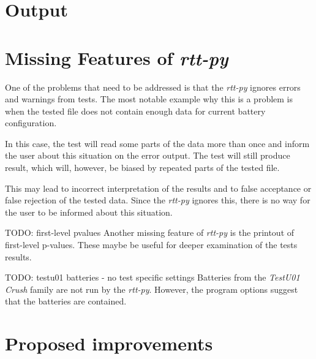 \documentclass[
  digital,     %
  oneside,     %
  nosansbold,  %
  nocolorbold, %
  nolof,         %
  nolot,         %
]{fithesis4}
\begin{document}
\section{Output}

\section{Missing Features of \emph{rtt-py}}
One of the problems that need to be addressed is that the \emph{rtt-py } ignores errors and warnings from tests. The most notable example why this is a problem is when the tested file does not contain enough data for current battery configuration.

In this case, the test will read some parts of the data more than once and inform the user about this situation on the error output. The test will still produce result, which will, however, be biased by repeated parts of the tested file.

This may lead to incorrect interpretation of the results and to false acceptance or false rejection of the tested data. Since the \emph{rtt-py} ignores this, there is no way for the user to be informed about this situation.

TODO: first-level pvalues
Another missing feature of \emph{rtt-py} is the printout of first-level p-values. These maybe be useful for deeper examination of the tests results.

TODO: testu01 batteries - no test specific settings
Batteries from the \emph{TestU01 Crush} family are not run by the \emph{rtt-py}. However, the program options suggest that the batteries are contained. 




\section{Proposed improvements}
 
\end{document}
